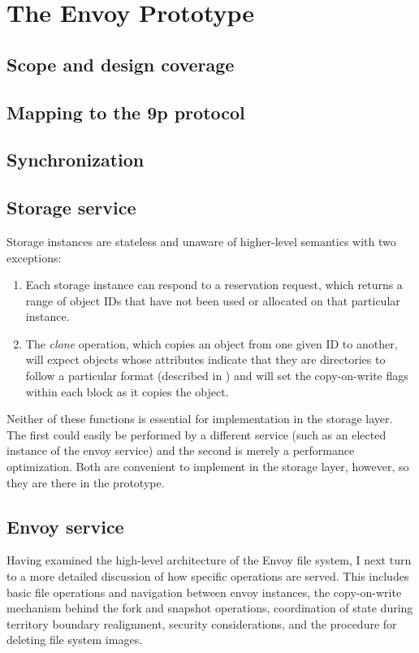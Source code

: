 \chapter{The Envoy Prototype}

\section{Scope and design coverage}

\section{Mapping to the 9p protocol}
\section{Synchronization}

\section{Storage service}

Storage instances are stateless and unaware of higher-level semantics with two exceptions:

\begin{enumerate}
\item Each storage instance can respond to a reservation request, which returns a range of object IDs that have not been used or allocated on that particular instance.
\item The \emph{clone} operation, which copies an object from one given ID to another, will expect objects whose attributes indicate that they are directories to follow a particular format (described in ) and will set the copy-on-write flags within each block as it copies the object.
\end{enumerate}

Neither of these functions is essential for implementation in the storage layer. The first could easily be performed by a different service (such as an elected instance of the envoy service) and the second is merely a performance optimization. Both are convenient to implement in the storage layer, however, so they are there in the prototype.

\section{Envoy service}

Having examined the high-level architecture of the Envoy file system, I next turn to a more detailed discussion of how specific operations are served. This includes basic file operations and navigation between envoy instances, the copy-on-write mechanism behind the fork and snapshot operations, coordination of state during territory boundary realignment, security considerations, and the procedure for deleting file system images.

